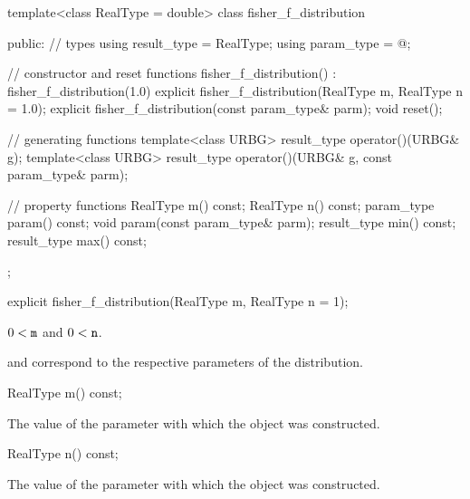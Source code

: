 %
%
\begin{codeblock}
template<class RealType = double>
  class fisher_f_distribution {
  public:
    // types
    using result_type = RealType;
    using param_type  = @\unspec@;

    // constructor and reset functions
    fisher_f_distribution() : fisher_f_distribution(1.0) {}
    explicit fisher_f_distribution(RealType m, RealType n = 1.0);
    explicit fisher_f_distribution(const param_type& parm);
    void reset();

    // generating functions
    template<class URBG>
      result_type operator()(URBG& g);
    template<class URBG>
      result_type operator()(URBG& g, const param_type& parm);

    // property functions
    RealType m() const;
    RealType n() const;
    param_type param() const;
    void param(const param_type& parm);
    result_type min() const;
    result_type max() const;
  };
\end{codeblock}


%
\begin{itemdecl}
explicit fisher_f_distribution(RealType m, RealType n = 1);
\end{itemdecl}

\begin{itemdescr}
\pnum
\expects
$0 < \texttt{m}$ and $0 < \texttt{n}$.

\pnum
\remarks
{} and 
correspond to the respective parameters of the distribution.
\end{itemdescr}

%
\begin{itemdecl}
RealType m() const;
\end{itemdecl}

\begin{itemdescr}
\pnum
\returns
The value of the  parameter
 with which the object was constructed.
\end{itemdescr}

%
\begin{itemdecl}
RealType n() const;
\end{itemdecl}

\begin{itemdescr}
\pnum
\returns
The value of the  parameter
 with which the object was constructed.
\end{itemdescr}

